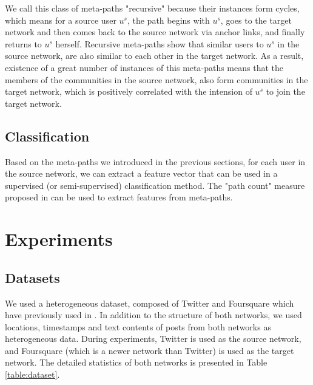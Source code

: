 \documentclass[conference]{IEEEtran}
\begin{document}
We call this class of meta-paths "recursive" because their instances form cycles, which means for a source user $u^s$, the path begins with  $u^s$, goes to the target network and then comes back to the source network via anchor links, and finally returns to $u^s$ herself. Recursive meta-paths show that similar users to $u^s$ in the source network, are also similar to each other in the target network. As a result, existence of a great number of instances of this meta-paths means that the members of the communities in the source network, also form communities in the target network, which is positively correlated with the intension of $u^s$ to join the target network.

\subsection{Classification}
Based on the meta-paths we introduced in the previous sections, for each user in the source network, we can extract a feature vector that can be used in a supervised (or semi-supervised) classification method. The "path count" measure proposed in \cite{sun2012mining} can be used to extract features from meta-paths.

\section{Experiments}\label{sec:experiments}

\subsection{Datasets}
We used a heterogeneous dataset, composed of Twitter and Foursquare which have previously used in \cite{zhang2014meta, zhang2014transferring, zhang2015integrated}. In addition to the structure of both networks, we used locations, timestamps and text contents of posts from both networks as heterogeneous data. During experiments, Twitter is used as the source network, and Foursquare (which is a newer network than Twitter) is used as the target network. The detailed statistics of both networks is presented in Table \ref{table:dataset}.
\end{document}
